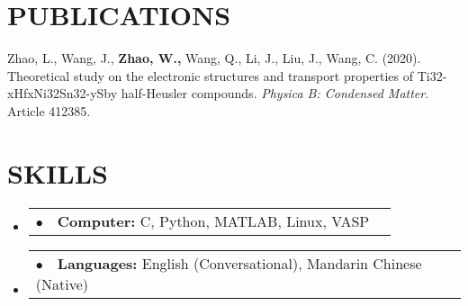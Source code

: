 \documentclass[letterpaper,11pt]{article}
\makeatletter
\newcommand{\resumeProjectHeading}[2]{
    \item
    \begin{tabular*}{1.001\textwidth}{l@{\extracolsep{\fill}}r}
      \small#1 & \textbf{\small #2}\\
    \end{tabular*}\vspace{-7pt}
}
\newcommand{\resumeSubHeadingListStart}{\begin{itemize}[leftmargin=0.0in, label={}]}
\newcommand{\resumeSubHeadingListEnd}{\end{itemize}}
\makeatother
\begin{document}
                       
\section{PUBLICATIONS}
Zhao, L., Wang, J., \textbf{Zhao, W.,} Wang, Q., Li, J., Liu, J., Wang, C. (2020). Theoretical study on the electronic structures and transport properties of Ti32-xHfxNi32Sn32-ySby half-Heusler compounds. \textit{Physica B: Condensed Matter}. Article 412385.

\section{SKILLS }
    \vspace{-5pt}
     \resumeSubHeadingListStart
                \resumeProjectHeading
          {$\bullet$~~\textbf{Computer:} C, Python, MATLAB, Linux, VASP}{}
                     \resumeSubHeadingListEnd
                                          \vspace{-1cm}
 \resumeSubHeadingListStart
                \resumeProjectHeading
          {$\bullet$~~\textbf{Languages:} English (Conversational), Mandarin Chinese (Native) }{}
                     \resumeSubHeadingListEnd


                
\end{document}
